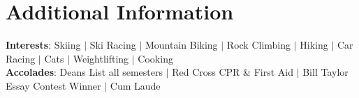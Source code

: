 \documentclass[10pt]{extarticle}
\begin{document}
\section{Additional Information}
\begin{itemize}
[leftmargin=0.15in, label={}]
 {\item{
 \textbf{Interests}{:  Skiing $|$ Ski Racing $|$ Mountain Biking $|$ Rock Climbing $|$ Hiking $|$ Car Racing $|$ Cats $|$ Weightlifting $|$ Cooking} \\
 \textbf{Accolades}{:  Deans List all semesters $|$ Red Cross CPR \& First Aid $|$ Bill Taylor Essay Contest Winner $|$ Cum Laude}
 }}

\end{itemize}
\end{document}
